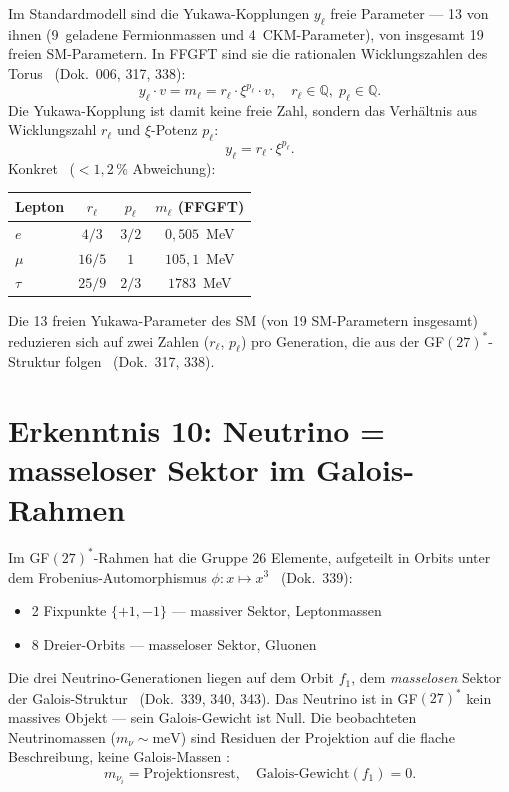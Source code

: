 Im Standardmodell sind die Yukawa-Kopplungen $y_\ell$ freie Parameter ---
13 von ihnen (9~geladene Fermionmassen und 4~CKM-Parameter), von insgesamt 19 freien SM-Parametern. In FFGFT sind sie die rationalen Wicklungszahlen des Torus
\BM\ (Dok.~006, 317, 338):
\begin{equation}
  y_\ell\cdot v = m_\ell = r_\ell\cdot\xi^{p_\ell}\cdot v,
  \quad r_\ell\in\mathbb{Q},\; p_\ell\in\mathbb{Q}.
  \label{eq:yukawa_winding}
\end{equation}
Die Yukawa-Kopplung ist damit keine freie Zahl, sondern das Verhältnis
aus Wicklungszahl $r_\ell$ und $\xi$-Potenz $p_\ell$:
\begin{equation}
  y_\ell = r_\ell\cdot\xi^{p_\ell}.
  \label{eq:yukawa_from_winding}
\end{equation}
Konkret \KM\ ($<1{,}2\,\%$ Abweichung):
\begin{center}
\begin{tabular}{@{}lccc@{}}
\toprule
Lepton & $r_\ell$ & $p_\ell$ & $m_\ell$ (FFGFT) \\
\midrule
$e$    & $4/3$   & $3/2$ & $0{,}505$~MeV \\
$\mu$  & $16/5$  & $1$   & $105{,}1$~MeV \\
$\tau$ & $25/9$  & $2/3$ & $1783$~MeV \\
\bottomrule
\end{tabular}
\end{center}
Die 13 freien Yukawa-Parameter des SM (von 19 SM-Parametern insgesamt) reduzieren sich auf zwei Zahlen
($r_\ell$, $p_\ell$) pro Generation, die aus der GF$(27)^*$-Struktur
folgen \BM\ (Dok.~317, 338).

\section{Erkenntnis 10: Neutrino = masseloser Sektor im Galois-Rahmen}

Im GF$(27)^*$-Rahmen hat die Gruppe 26 Elemente, aufgeteilt in Orbits
unter dem Frobenius-Automorphismus $\phi: x\mapsto x^3$ \BM\ (Dok.~339):
\begin{itemize}
  \item 2 Fixpunkte $\{+1,-1\}$ --- massiver Sektor, Leptonmassen
  \item 8 Dreier-Orbits --- masseloser Sektor, Gluonen
\end{itemize}

Die drei Neutrino-Generationen liegen auf dem Orbit $f_1$, dem
\emph{masselosen} Sektor der Galois-Struktur \BM\ (Dok.~339, 340, 343).
Das Neutrino ist in GF$(27)^*$ kein massives Objekt --- sein Galois-Gewicht
ist Null. Die beobachteten Neutrinomassen ($m_\nu \sim \text{meV}$) sind
Residuen der Projektion auf die flache Beschreibung, keine Galois-Massen \KM:
\begin{equation}
  m_{\nu_i} = \text{Projektionsrest},\quad
  \text{Galois-Gewicht}(f_1) = 0.
  \label{eq:neutrino_galois}
\end{equation}

